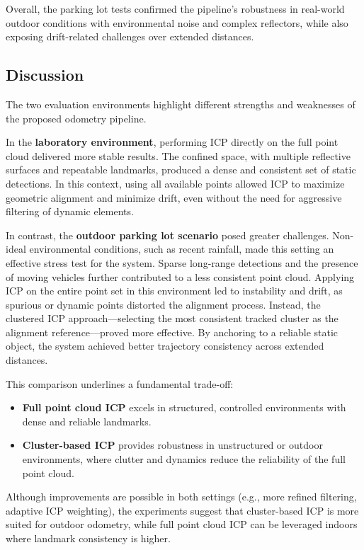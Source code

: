 Overall, the parking lot tests confirmed the pipeline's robustness in real-world outdoor conditions with environmental noise and complex reflectors, while also exposing drift-related challenges over extended distances.


\subsection{Discussion}
The two evaluation environments highlight different strengths and weaknesses of the proposed odometry pipeline.  

In the \textbf{laboratory environment}, performing ICP directly on the full point cloud delivered more stable results.  
The confined space, with multiple reflective surfaces and repeatable landmarks, produced a dense and consistent set of static detections.  
In this context, using all available points allowed ICP to maximize geometric alignment and minimize drift, even without the need for aggressive filtering of dynamic elements.  

In contrast, the \textbf{outdoor parking lot scenario} posed greater challenges.  
Non-ideal environmental conditions, such as recent rainfall, made this setting an effective stress test for the system.  
Sparse long-range detections and the presence of moving vehicles further contributed to a less consistent point cloud.  
Applying ICP on the entire point set in this environment led to instability and drift, as spurious or dynamic points distorted the alignment process.  
Instead, the clustered ICP approach—selecting the most consistent tracked cluster as the alignment reference—proved more effective.  
By anchoring to a reliable static object, the system achieved better trajectory consistency across extended distances.  

This comparison underlines a fundamental trade-off:
\begin{itemize}
    \item \textbf{Full point cloud ICP} excels in structured, controlled environments with dense and reliable landmarks.
    \item \textbf{Cluster-based ICP} provides robustness in unstructured or outdoor environments, where clutter and dynamics reduce the reliability of the full point cloud.
\end{itemize}

Although improvements are possible in both settings (e.g., more refined filtering, adaptive ICP weighting), the experiments suggest that cluster-based ICP is more suited for outdoor odometry, while full point cloud ICP can be leveraged indoors where landmark consistency is higher.
